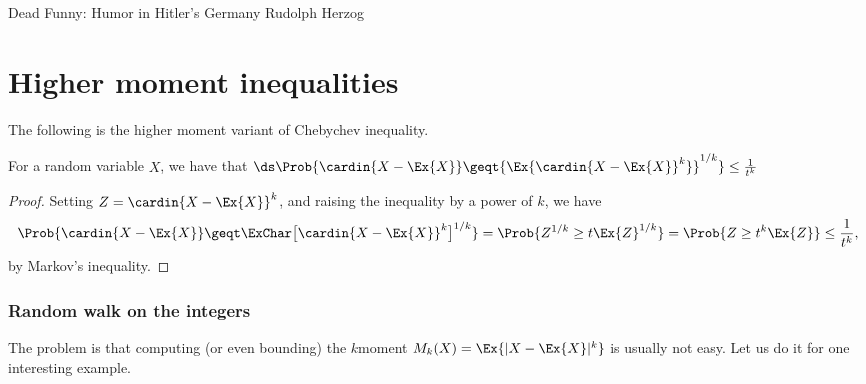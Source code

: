 \makeatletter
{}
\makeatother
\ifx\bookMode\undefined%
\fi
{}


\ChapterPrefix{}
\ChapterGen{}

%
{Dead Funny: Humor in Hitler's Germany}%
{Rudolph Herzog}


\section{Higher moment inequalities}

The following is the higher
moment variant of Chebychev inequality.
\begin{lemma}
    For a random variable $X$, we have that
    \begin{math}
        \ds%
        \Prob{\cardin{X - \Ex{X}}
      \geq%
      t {\Ex{ \bigl. {\cardin{X -  \Ex{X}}}^k} }^{1/k}}
      \leq
      \frac{1}{t^k}
  \end{math}
\end{lemma}
\begin{proof}
    Setting $Z = \cardin{X - \Ex{X}}^k$, and
    raising the inequality by a power of $k$, we have
    \begin{align*}
      \Prob{\cardin{X - \Ex{X}} \geq%
      t \ExChar \bigl[ \cardin{X - \Ex{X}}^k \bigr]^{1/k} } %
      = %
      \Prob{Z^{1/k} \geq t \Ex{ Z }^{1/k}}
      =%
      \Prob{Z \geq t^k \Ex{Z}}%
      \leq%
      \frac{1}{t^k},
    \end{align*}
    by Markov's inequality.
\end{proof}

\subsubsection{Random walk on the integers}

The problem is that computing (or even bounding) the $k$\th moment
$M_k(X) = \Ex{|X-\Ex{X}|^k}$ is usually not easy. Let us do it for one
interesting example.

